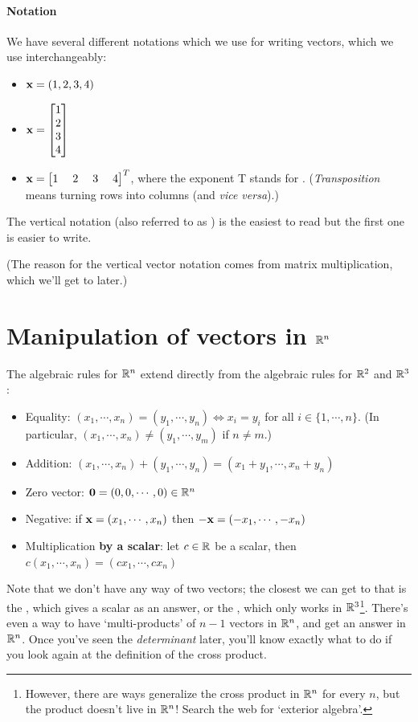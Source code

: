 \paragraph{Notation}  We have several different notations which we use for
writing vectors, which we use interchangeably:
\begin{itemize}
\item $\mathbf{x} = (1,2,3,4)$
\item $\mathbf{x} = \left[ \begin{matrix} 1\\2\\3\\4 \end{matrix} \right]$
\item $\mathbf{x} = \left[ \begin{matrix} 1\;&2\;&3\;&4 \end{matrix} \right]^T$, where the exponent T stands for
.  (\emph{Transposition} means turning rows into columns (and \emph{vice versa}).)
\end{itemize}
The vertical notation (also referred to as ) is the easiest to read but the first one is easier
to write.

  

(The reason for the vertical
vector notation comes from matrix multiplication, which we'll get to later.)

\section{Manipulation of vectors in \texorpdfstring{$\mathbb{R}^n$}{Rn}}  

The algebraic rules for $\mathbb{R}^n$ extend directly from the algebraic
rules for $\mathbb{R}^2$ and $\mathbb{R}^3$: 
\begin{itemize}
\item Equality:  $(x_1,\cdots, x_n) = (y_1,\cdots, y_n) \Leftrightarrow x_i=y_i$ for all $i \in \{1,\cdots,n\}$.  (In particular, $(x_1,\cdots,x_n) \neq (y_1,\cdots, y_m)$ if $n \neq m$.)

\item Addition:  $(x_1,\cdots,x_n) + (y_1,\cdots, y_n) = (x_1+y_1, \cdots, x_n+y_n)$
\item Zero vector:  $\mathbf{0} = (0,0,\cdots, 0) \in \mathbb{R}^n$
\item Negative:  if $\mathbf{x} = (x_1,\cdots,x_n)$ then $-\mathbf{x} = (-x_1,\cdots,-x_n)$
\item Multiplication {\bf by a scalar}:  let $c\in \mathbb{R}$ be a scalar, then
$c(x_1,\cdots,x_n) = (cx_1,\cdots,cx_n)$
\end{itemize}
Note that we don't have any way of  two vectors; the closest
we can get to that is the , which gives a scalar as an 
answer, or the , which only works in $\mathbb{R}^3$\footnote{However, there are ways generalize the cross product in $\mathbb{R}^n$ for every $n$, but the product doesn't live in $\mathbb{R}^n$! Search the web for `exterior algebra'.}.
 There's even a way to have `multi-products' of $n-1$ vectors in $\mathbb{R}^n$, and get an answer in $\mathbb{R}^n$. Once you've seen the {\it determinant} later, you'll know exactly what to do if you look again at the definition of the cross product.

